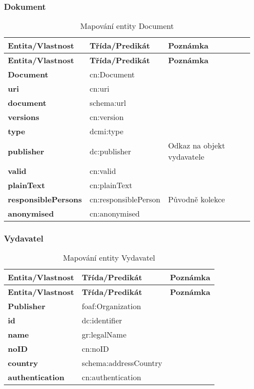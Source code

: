 \subsubsection*{Dokument}

\begin{center}
\begin{longtable}{lp{30mm}p{65mm}}
\label{grid_mlmmh} \\
\multicolumn{1}{l}{\textbf{Entita/Vlastnost}} & 
\multicolumn{1}{l}{\textbf{Třída/Predikát}} & 
\multicolumn{1}{l}{\textbf{Poznámka}} \\ \hline 
\endfirsthead
\multicolumn{1}{l}{\textbf{Entita/Vlastnost}} & 
\multicolumn{1}{l}{\textbf{Třída/Predikát}} & 
\multicolumn{1}{l}{\textbf{Poznámka}} \\ \hline 
\hline
\endhead
\endfoot
\caption{Mapování entity Document}
\endlastfoot
\textbf{Document} & cn:Document \\
\textbf{uri} & cn:uri \\
\textbf{document} & schema:url \\
\textbf{versions} & cn:version \\
\textbf{type} & dcmi:type \\
\textbf{publisher} & dc:publisher & Odkaz na objekt vydavatele \\
\textbf{valid} & cn:valid \\
\textbf{plainText} & cn:plainText \\
\textbf{responsiblePersons} & cn:responsiblePerson & Původně kolekce \\
\textbf{anonymised} & cn:anonymised \\
\end{longtable}
\end{center}

\subsubsection*{Vydavatel}

\begin{center}
\begin{longtable}{lp{30mm}p{65mm}}
\label{grid_mlmmh} \\
\multicolumn{1}{l}{\textbf{Entita/Vlastnost}} & 
\multicolumn{1}{l}{\textbf{Třída/Predikát}} & 
\multicolumn{1}{l}{\textbf{Poznámka}} \\ \hline 
\endfirsthead
\multicolumn{1}{l}{\textbf{Entita/Vlastnost}} & 
\multicolumn{1}{l}{\textbf{Třída/Predikát}} & 
\multicolumn{1}{l}{\textbf{Poznámka}} \\ \hline 
\hline
\endhead
\endfoot
\caption{Mapování entity Vydavatel}
\endlastfoot
\textbf{Publisher} & foaf:Organization & \\
\textbf{id} & dc:identifier \\
\textbf{name} & gr:legalName \\
\textbf{noID} & cn:noID \\
\textbf{country} & schema:addressCountry \\
\textbf{authentication} & cn:authentication \\
\end{longtable}
\end{center}

